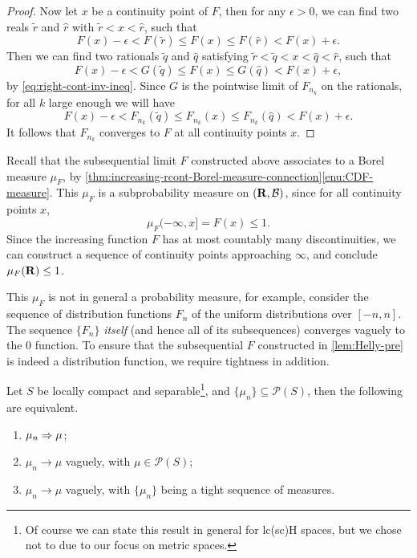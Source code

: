 \begin{proof}
    Now let $x$ be a continuity point of $F$, then for any $\epsilon > 0$, we can find two reals $\tilde r$ and $\hat r$ with $\tilde r <  x < \hat r$, such that \[
        F(x) - \epsilon < F(\tilde r) \leq F(x) \leq F(\hat r) < F(x) + \epsilon.
    \] Then we can find two rationals $\tilde q$ and $\hat q$ satisfying $\tilde r < \tilde q < x < \hat q < \hat r$, such that \[
        F(x) - \epsilon < G(\tilde q) \leq F(x) \leq G(\hat q) < F(x) + \epsilon,
    \] by \eqref{eq:right-cont-inv-ineq}. Since $G$ is the pointwise limit of $F_{n_k}$ on the rationals, for all $k$ large enough we will have \[
        F(x) - \epsilon < F_{n_k}(\tilde q) \leq F_{n_k}(x) \leq F_{n_k}(\hat q) < F(x) + \epsilon.
    \] It follows that $F_{n_k}$ converges to $F$ at all continuity points $x$.
\end{proof}

Recall that the subsequential limit $F$ constructed above associates to a Borel measure $\mu_F$, by \cref{thm:increasing-rcont-Borel-measure-connection}\ref{enu:CDF-measure}. This $\mu_F$ is a subprobability measure on $(\mathbf{R},\mathcal{B})$, since for all continuity points $x$, \[\mu_F(-\infty,x] = F(x)\leq 1.\] Since the increasing function $F$ has at most countably many discontinuities, we can construct a sequence of continuity points approaching $\infty$, and conclude $\mu_F(\mathbf{R})\leq 1$.

This $\mu_F$ is not in general a probability measure, for example, consider the sequence of distribution functions $F_n$ of the uniform distributions over $[-n,n]$. The sequence $\{F_n\}$ \emph{itself} (and hence all of its subsequences) converges vaguely to the $0$ function. To ensure that the subsequential $F$ constructed in \cref{lem:Helly-pre} is indeed a distribution function, we require tightness in addition.

\begin{thm}
    Let $S$ be locally compact and separable\footnote{Of course we can state this result in general for lc(sc)H spaces, but we chose not to due to our focus on metric spaces.}, and $\{\mu_n\} \subseteq \mathcal P(S)$, then the following are equivalent. \begin{enumerate}
        \item $\mu_n \Rightarrow \mu$;
        \item $\mu_n \to \mu$ vaguely, with $\mu\in \mathcal P(S)$;
        \item $\mu_n \to \mu$ vaguely, with $\{\mu_n\}$ being a tight sequence of measures.
    \end{enumerate}
\end{thm}



